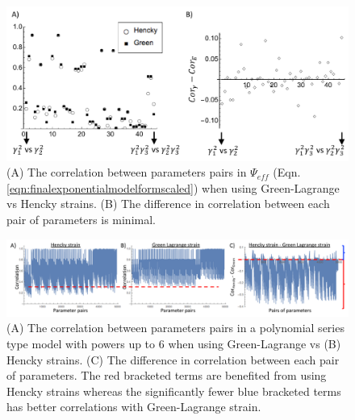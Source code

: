 \begin{figure}
\centering
\includegraphics[width=6.0in]{Figures/gvsecorrelationeff}
\caption{(A) The correlation between parameters pairs in $\Psi_{eff}$ (Eqn. \ref{eqn:finalexponentialmodelformscaled}) when using Green-Lagrange vs Hencky strains. (B) The difference in correlation between each pair of parameters is minimal.}
\label{fig:gvsecorrelationeff}
\end{figure}


\begin{figure}
\centering
\includegraphics[width=6.5in]{Figures/gvsecorrelationpoly}
\caption{(A) The correlation between parameters pairs in a polynomial series type model with powers up to 6 when using Green-Lagrange vs (B) Hencky strains. (C) The difference in correlation between each pair of parameters. The red bracketed terms are benefited from using Hencky strains whereas the significantly fewer blue bracketed terms has better correlations with Green-Lagrange strain.}
\label{fig:gvsecorrelationpoly}
\end{figure}














